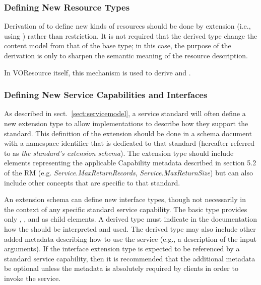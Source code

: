 \documentclass[11pt,a4paper]{ivoa}
\begin{document}
\subsubsection{Defining New Resource Types}
\label{sect:definingresourcetypes}


Derivation of  to define new kinds of
resources should be done by extension (i.e., using
) rather than restriction.  It is
not required that the derived type change the content model from that
of the  base type; in this case, the purpose
of the derivation is only to sharpen the semantic meaning of the
resource description.

In VOResource itself, this mechanism is used to derive
and .

\subsubsection{Defining New Service Capabilities and Interfaces}
\label{sect:serviceelements}


As described in sect.~\ref{sect:servicemodel}, a service
standard will often define a new  extension
type to allow implementations to describe how they support the
standard.  This definition of the  extension
should be done in a schema document with a namespace identifier that
is dedicated to that standard (hereafter referred to as \emph{the
standard's extension schema}).  The extension type should include
elements representing the applicable Capability metadata described in
section 5.2 of the RM
(e.g. \emph{Service.MaxReturnRecords}, \emph{Service.MaxReturnSize})
but can also include other concepts that are specific to that standard.


An extension schema can define new interface types, though not
necessarily in the context of any specific standard service
capability.  The basic  type provides only
, , and  as child
elements.  A derived  type must indicate in
the documentation how the  should be
interpreted and used.  The derived type may also include other added
metadata describing how to use the service (e.g., a description of the
input arguments).  If the interface extension type is expected to be
referenced by a standard service capability, then it is recommended
that the additional metadata be optional unless the metadata is
absolutely required by clients in order to invoke the service.
\end{document}
